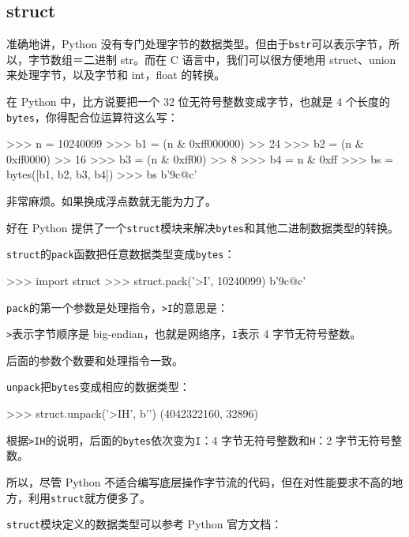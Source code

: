 \hypertarget{struct}{%
\subsection{struct}\label{struct}}

准确地讲，Python
没有专门处理字节的数据类型。但由于\texttt{b\textquotesingle{}str\textquotesingle{}}可以表示字节，所以，字节数组＝二进制
str。而在 C 语言中，我们可以很方便地用 struct、union
来处理字节，以及字节和 int，float 的转换。

在 Python 中，比方说要把一个 32 位无符号整数变成字节，也就是 4
个长度的\texttt{bytes}，你得配合位运算符这么写：

\begin{pythoncode}
>>> n = 10240099
>>> b1 = (n & 0xff000000) >> 24
>>> b2 = (n & 0xff0000) >> 16
>>> b3 = (n & 0xff00) >> 8
>>> b4 = n & 0xff
>>> bs = bytes([b1, b2, b3, b4])
>>> bs
b'\x9c@c'
\end{pythoncode}

非常麻烦。如果换成浮点数就无能为力了。

好在 Python
提供了一个\texttt{struct}模块来解决\texttt{bytes}和其他二进制数据类型的转换。

\texttt{struct}的\texttt{pack}函数把任意数据类型变成\texttt{bytes}：

\begin{pythoncode}
>>> import struct
>>> struct.pack('>I', 10240099)
b'\x9c@c'
\end{pythoncode}

\texttt{pack}的第一个参数是处理指令，\texttt{\textquotesingle{}\textgreater{}I\textquotesingle{}}的意思是：

\texttt{\textgreater{}}表示字节顺序是
big-endian，也就是网络序，\texttt{I}表示 4 字节无符号整数。

后面的参数个数要和处理指令一致。

\texttt{unpack}把\texttt{bytes}变成相应的数据类型：

\begin{pythoncode}
>>> struct.unpack('>IH', b'')
(4042322160, 32896)
\end{pythoncode}

根据\texttt{\textgreater{}IH}的说明，后面的\texttt{bytes}依次变为\texttt{I}：4
字节无符号整数和\texttt{H}：2 字节无符号整数。

所以，尽管 Python
不适合编写底层操作字节流的代码，但在对性能要求不高的地方，利用\texttt{struct}就方便多了。

\texttt{struct}模块定义的数据类型可以参考 Python 官方文档：

